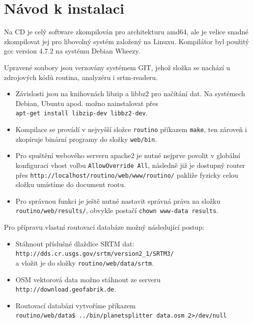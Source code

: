 \documentclass[thesis=B,czech]{FITthesis}[2012/06/26]
\begin{document}
\chapter{Návod k instalaci}

Na CD je celý software zkompilován pro architekturu amd64, ale je velice snadné zkompilovat jej pro libovolný systém založený na Linuxu. Kompilátor byl použitý gcc version 4.7.2 na systému Debian Wheezy. 

Upravené soubory jsou verzovány systémem GIT, jehož složka se nachází u zdrojových kódů routina, analyzéru i srtm-readeru.

\begin{itemize}
\item{Závislosti jsou na knihovnách libzip a libbz2 pro načítání dat. Na systémech Debian, Ubuntu apod. možno nainstalovat přes \\ \verb|apt-get install libzip-dev libbz2-dev|.
}

\item{Kompilace se provádí v nejvyšší složce \verb|routino| příkazem \verb|make|, ten zároveň i zkopíruje binární programy do složky \verb|web/bin|. 
}

\item{Pro spuštění webového serveru apache2 je nutné nejprve povolit v globální konfiguraci vhost volbu \verb|AllowOverride All|, následně již je dostupný router přes \verb|http://localhost/routino/web/www/routino/| pakliže fyzicky celou složku umístíme do document rootu.
}

\item{Pro správnou funkci je ještě nutné nastavit správná práva na složku \verb|routino/web/results/|, obvykle postačí \verb|chown www-data results|.}

\end{itemize}




Pro přípravu vlastní routovací databáze možný následující postup:

\begin{itemize}

\item{Stáhnout příslušné dlaždice SRTM dat: \\ \verb|http://dds.cr.usgs.gov/srtm/version2_1/SRTM3/| \\
a vložit je do složky \verb|routino/web/data/srtm|.}

\item{OSM vektorová data možno stáhnout ze serveru \\ \verb|http://download.geofabrik.de|.}

\item{Routovací databázi vytvoříme příkazem \\ 
\verb|routino/web/data$ ../bin/planetsplitter data.osm 2>/dev/null|}

\end{itemize}
\end{document}
